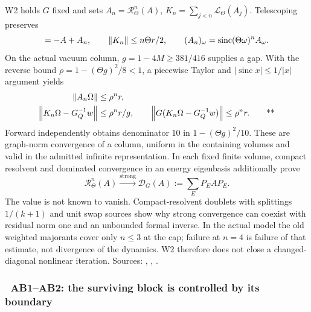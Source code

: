 W2 holds $G$ fixed and sets $A_n=\mathcal R_\Theta^n(A)$,
$K_n=\sum_{j<n}\mathcal L_\Theta(A_j)$.  Telescoping preserves
\begin{equation}
 [K_n,G]=-A+A_n,\qquad
 \norm{K_n}\le n\Theta r/2,\qquad
 (A_n)_\omega=\operatorname{sinc}(\Theta\omega)^nA_\omega.
 \label{recent:iterate-filter}
\end{equation}
On the actual vacuum column, $g=1-4M\ge381/416$ supplies a gap.  With the
reverse bound $\rho=1-(\Theta g)^2/8<1$, a piecewise Taylor and
$|\operatorname{sinc}x|\le1/|x|$ argument yields
\begin{align}
 \left\lVert A_n\Omega\right\rVert&\le\rho^nr,\notag\\
 \left\lVert K_n\Omega-G_Q^{-1}w\right\rVert&\le\rho^nr/g,\qquad
 \left\lVert G(K_n\Omega-G_Q^{-1}w)\right\rVert\le\rho^nr. \qquad\text{**}
 \label{recent:column-convergence}
\end{align}
Forward independently obtains denominator 10 in $1-(\Theta g)^2/10$.
These are graph-norm convergence of a column, uniform in the containing volumes
and valid in the admitted infinite representation.  In each fixed finite volume,
compact resolvent and dominated convergence in an energy eigenbasis additionally
prove
\begin{equation}
 \mathcal R_\Theta^n(A)\xrightarrow{\mathrm{strong}}
 \mathcal D_G(A):=\sum_EP_EAP_E.
 \label{recent:pinching-limit}
\end{equation}
The value is not known to vanish.  Compact-resolvent doublets with splittings
$1/(k+1)$ and unit swap sources show why strong convergence can coexist with
residual norm one and an unbounded formal inverse.  In the actual model the old
weighted majorants cover only $n\le3$ at the cap; failure at $n=4$ is failure of
that estimate, not divergence of the dynamics.  W2 therefore does not close a
changed-diagonal nonlinear iteration.
Sources: ,
,
.

\subsubsection{\workstar\ AB1--AB2: the surviving block is controlled by its boundary}

